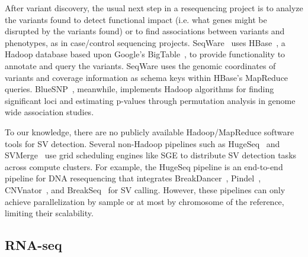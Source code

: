 After variant discovery, the usual next step in a resequencing project is to analyze the variants found to detect functional impact (i.e. what genes might be disrupted by the variants found) or to find associations between variants and phenotypes, as in case/control sequencing projects. SeqWare~\cite{Oconnor:2010p1835} uses HBase~\cite{hbase}, a Hadoop database based upon Google's BigTable~\cite{Chang:2008:BDS:1365815.1365816}, to provide functionality to annotate and query the variants. SeqWare uses the genomic coordinates of variants and coverage information as schema keys within HBase's MapReduce queries. BlueSNP~\cite{Huang:2012bb}, meanwhile, implements Hadoop algorithms for finding significant loci and estimating p-values through permutation analysis in genome wide association studies.

To our knowledge, there are no publicly available Hadoop/MapReduce software tools for SV detection. Several non-Hadoop pipelines such as HugeSeq~\cite{Lam:2012jy} and SVMerge~\cite{Wong:2010p1271} use grid scheduling engines like SGE to distribute SV detection tasks across compute clusters. For example, the HugeSeq pipeline is an end-to-end pipeline for DNA resequencing that integrates BreakDancer~\cite{Chen:2009p3}, Pindel~\cite{Ye:2009p2}, CNVnator~\cite{Abyzov:2011bk}, and BreakSeq~\cite{Lam:2010p1383} for SV calling. However, these pipelines can only achieve parallelization by sample or at most by chromosome of the reference, limiting their scalability.

\subsection{RNA-seq}

